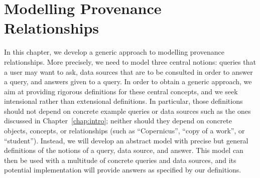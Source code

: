\chapter{Modelling Provenance Relationships}
\label{chap:modelling}

In this chapter, we develop a generic approach to modelling provenance relationships.
More precisely, we need to model three central notions: queries that a user may want to ask,
data sources that are to be consulted in order to answer a query,
and answers given to a query.
In order to obtain a generic approach, we aim at providing rigorous definitions
for these central concepts, and we seek intensional rather than extensional definitions.
In particular, those definitions should not depend on concrete example queries or data sources
such as the ones discussed in Chapter~\ref{chap:intro};
neither should they depend on concrete objects, concepts, or relationships (such as ``Copernicus'', ``copy of a work'', or ``student'').
Instead, we will develop an abstract model with precise but general definitions
of the notions of a query, data source, and answer.
This model can then be used with a multitude of concrete queries and data sources,
and its potential implementation will provide answers as specified by our definitions.

%

